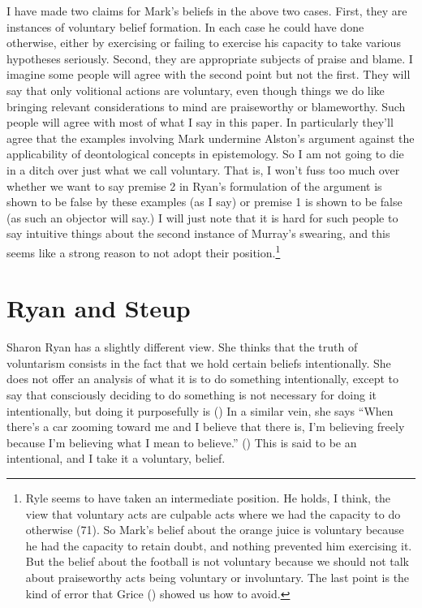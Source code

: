 \documentclass[
  11pt,
  letterpaper,
  DIV=11,
  numbers=noendperiod,
  twoside]{scrartcl}
\begin{document}
I have made two claims for Mark's beliefs in the above two cases. First,
they are instances of voluntary belief formation. In each case he could
have done otherwise, either by exercising or failing to exercise his
capacity to take various hypotheses seriously. Second, they are
appropriate subjects of praise and blame. I imagine some people will
agree with the second point but not the first. They will say that only
volitional actions are voluntary, even though things we do like bringing
relevant considerations to mind are praiseworthy or blameworthy. Such
people will agree with most of what I say in this paper. In particularly
they'll agree that the examples involving Mark undermine Alston's
argument against the applicability of deontological concepts in
epistemology. So I am not going to die in a ditch over just what we call
voluntary. That is, I won't fuss too much over whether we want to say
premise 2 in Ryan's formulation of the argument is shown to be false by
these examples (as I say) or premise 1 is shown to be false (as such an
objector will say.) I will just note that it is hard for such people to
say intuitive things about the second instance of Murray's swearing, and
this seems like a strong reason to not adopt their position.\footnote{Ryle
  seems to have taken an intermediate position. He holds, I think, the
  view that voluntary acts are culpable acts where we had the capacity
  to do otherwise (71). So Mark's belief about the orange juice is
  voluntary because he had the capacity to retain doubt, and nothing
  prevented him exercising it. But the belief about the football is not
  voluntary because we should not talk about praiseworthy acts being
  voluntary or involuntary. The last point is the kind of error that
  Grice () showed us how to avoid.}

\section{Ryan and Steup}\label{ryan-and-steup}

Sharon Ryan has a slightly different view. She thinks that the truth of
voluntarism consists in the fact that we hold certain beliefs
intentionally. She does not offer an analysis of what it is to do
something intentionally, except to say that consciously deciding to do
something is not necessary for doing it intentionally, but doing it
purposefully is () In a
similar vein, she says ``When there's a car zooming toward me and I
believe that there is, I'm believing freely because I'm believing what I
mean to believe.'' () This is said
to be an intentional, and I take it a voluntary, belief.
\end{document}
